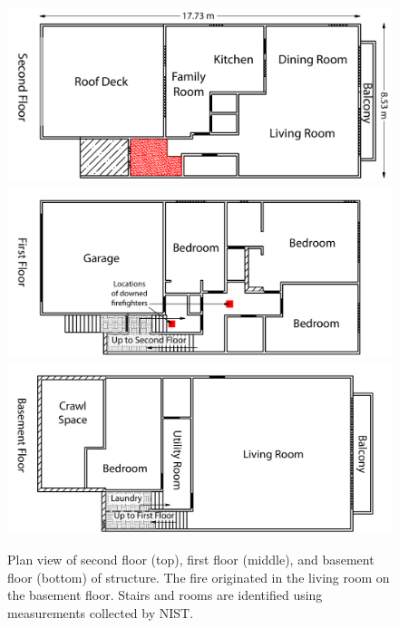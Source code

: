 \documentclass[12pt,oneside]{book}
\begin{document}
\begin{figure}[!ht]
\includegraphics[width=5.0in]{../Figures/Plan_Second_Floor_Metric}
\includegraphics[width=5.0in]{../Figures/Plan_First_Floor_Metric}
\includegraphics[width=5.0in]{../Figures/Plan_Basement_Metric}
\caption[Plan view of second floor (top), first floor (middle), and basement floor (bottom) of structure.]{Plan view of second floor (top), first floor (middle), and basement floor (bottom) of structure. The fire originated in the living room on the basement floor. Stairs and rooms are identified using measurements collected by NIST.}
\label{fig:floor_plan}
\end{figure}
\end{document}
